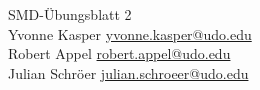 




\begin{center}
{\huge SMD-Übungsblatt 2} \\
\vspace{1cm}
  Yvonne Kasper%
  \texorpdfstring{
    \href{mailto:authorA@udo.edu}{yvonne.kasper@udo.edu}
  }{}%
\\
  \texorpdfstring{}{, }
  Robert Appel%
  \texorpdfstring{
    \href{mailto:authorB@udo.edu}{robert.appel@udo.edu}
  }{}%
\\
  \texorpdfstring{}{, }
  Julian Schröer%
  \texorpdfstring{
    \href{mailto:authorB@udo.edu}{julian.schroeer@udo.edu}
  }{}%
\end{center}





\printbibliography


